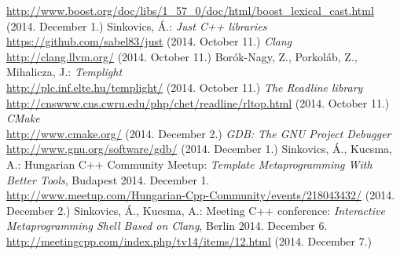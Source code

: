 \documentclass[a4paper,12pt]{report}
\begin{document}
\begin{thebibliography}{99}
    \url{http://www.boost.org/doc/libs/1_57_0/doc/html/boost_lexical_cast.html}
    (2014. December 1.)
    Sinkovics, Á.:
    \textit{Just C++ libraries} \\
    \url{https://github.com/sabel83/just} (2014. October 11.)
    \textit{Clang} \\
    \url{http://clang.llvm.org/} (2014. October 11.)
    Borók-Nagy, Z., Porkoláb, Z., Mihalicza, J.:
    \textit{Templight} \\
    \url{http://plc.inf.elte.hu/templight/} (2014. October 11.)
    \textit{The Readline library} \\
    \url{http://cnswww.cns.cwru.edu/php/chet/readline/rltop.html}
    (2014. October 11.)
    \textit{CMake} \\
    \url{http://www.cmake.org/}
    (2014. December 2.)
    \textit{GDB: The GNU Project Debugger} \\
    \url{http://www.gnu.org/software/gdb/}
    (2014. December 1.)
    Sinkovics, Á., Kucsma, A.:
    Hungarian C++ Community Meetup:
    \textit{Template Metaprogramming With Better Tools}, Budapest 2014.
    December 1. \\
    \url{http://www.meetup.com/Hungarian-Cpp-Community/events/218043432/}
    (2014. December 2.)
    Sinkovics, Á., Kucsma, A.:
    Meeting C++ conference:
    \textit{Interactive Metaprogramming Shell Based on Clang}, Berlin 2014.
    December 6.
    \url{http://meetingcpp.com/index.php/tv14/items/12.html}
    (2014. December 7.)
\end{thebibliography}
\end{document}
